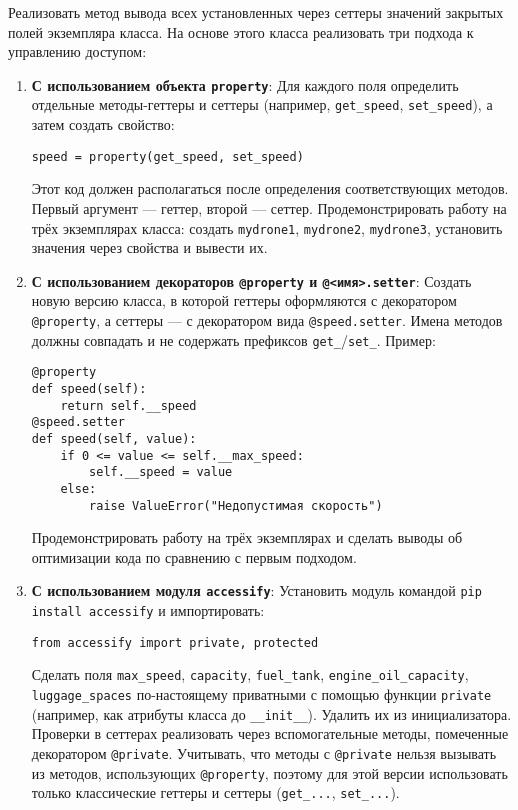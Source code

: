 \begin{enumerate}
\begin{itemize}
\end{itemize}
Реализовать метод вывода всех установленных через сеттеры значений закрытых полей экземпляра класса.
На основе этого класса реализовать три подхода к управлению доступом:
\begin{enumerate}
    \item \textbf{С использованием объекта \texttt{property}}:  
    Для каждого поля определить отдельные методы-геттеры и сеттеры (например, \texttt{get\_speed}, \texttt{set\_speed}), а затем создать свойство:  
    \begin{verbatim}
speed = property(get_speed, set_speed)
    \end{verbatim}  
    Этот код должен располагаться после определения соответствующих методов. Первый аргумент — геттер, второй — сеттер.  
    Продемонстрировать работу на трёх экземплярах класса: создать \texttt{mydrone1}, \texttt{mydrone2}, \texttt{mydrone3}, установить значения через свойства и вывести их.
    \item \textbf{С использованием декораторов \texttt{@property} и \texttt{@<имя>.setter}}:  
    Создать новую версию класса, в которой геттеры оформляются с декоратором \texttt{@property}, а сеттеры — с декоратором вида \texttt{@speed.setter}. Имена методов должны совпадать и не содержать префиксов \texttt{get\_}/\texttt{set\_}.  
    Пример:  
    \begin{verbatim}
@property
def speed(self):
    return self.__speed
@speed.setter
def speed(self, value):
    if 0 <= value <= self.__max_speed:
        self.__speed = value
    else:
        raise ValueError("Недопустимая скорость")
    \end{verbatim}  
    Продемонстрировать работу на трёх экземплярах и сделать выводы об оптимизации кода по сравнению с первым подходом.
    \item \textbf{С использованием модуля \texttt{accessify}}:  
    Установить модуль командой \texttt{pip install accessify} и импортировать:  
    \begin{verbatim}
from accessify import private, protected
    \end{verbatim}  
    Сделать поля \texttt{max\_speed}, \texttt{capacity}, \texttt{fuel\_tank}, \texttt{engine\_oil\_capacity}, \texttt{luggage\_spaces} по-настоящему приватными с помощью функции \texttt{private} (например, как атрибуты класса до \texttt{\_\_init\_\_}). Удалить их из инициализатора.  
    Проверки в сеттерах реализовать через вспомогательные методы, помеченные декоратором \texttt{@private}.  
    Учитывать, что методы с \texttt{@private} нельзя вызывать из методов, использующих \texttt{@property}, поэтому для этой версии использовать только классические геттеры и сеттеры (\texttt{get\_...}, \texttt{set\_...}).  

\end{enumerate}
\end{enumerate}
